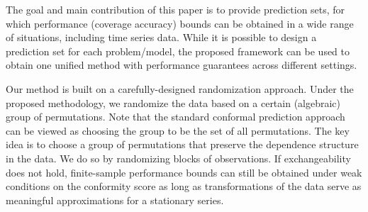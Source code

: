 \documentclass[final,12pt]{colt2018} %
\begin{document}
The goal and main contribution of this paper is to provide prediction sets, for which performance (coverage accuracy) bounds can be obtained in a wide range of situations, including time series data. While it is possible to design a prediction set for each problem/model, the proposed framework can be used to obtain one unified method with performance guarantees across different settings.


Our method is built on a carefully-designed randomization approach. Under the proposed methodology, we randomize the data based on a certain (algebraic) group of permutations. Note that the standard conformal prediction approach can be viewed as choosing the group to be the set of all permutations.
The key idea is to choose a group of permutations that preserve the dependence structure in the data. We do so by randomizing blocks of observations. If exchangeability does not hold, finite-sample performance bounds can still be obtained under weak conditions on the conformity score as long as transformations of the data serve as meaningful approximations for a stationary series. 
\end{document}
